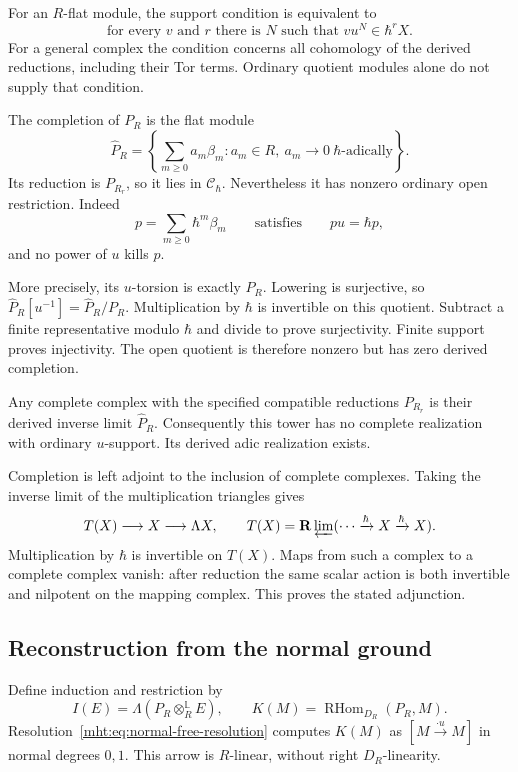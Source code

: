 For an $R$-flat module, the support condition is equivalent to
\[
 \text{for every }v\text{ and }r\text{ there is }N
             \text{ such that }vu^N\in\hbar^rX.
\]
For a general complex the condition concerns all cohomology
of the derived reductions, including their Tor terms.
Ordinary quotient modules alone do not supply that condition.

\begin{example}\label{mht:ex:completed-principal-parts}
The completion of $P_R$ is the flat module
\[
 \widehat P_R=
 \left\{\sum_{m\geq0}a_m\beta_m:
       a_m\in R,\ a_m\longrightarrow0\ \hbar\text{-adically}\right\}.
\]
Its reduction is $P_{R_r}$, so it lies in $\mathcal C_\hbar$.
Nevertheless it has nonzero ordinary open restriction.
Indeed
\[
 p=\sum_{m\geq0}\hbar^m\beta_m
 \qquad\text{satisfies}\qquad pu=\hbar p,
\]
and no power of $u$ kills $p$.

More precisely, its $u$-torsion is exactly $P_R$.
Lowering is surjective, so
$\widehat P_R[u^{-1}]=\widehat P_R/P_R$.
Multiplication by $\hbar$ is invertible on this quotient.
Subtract a finite representative modulo $\hbar$ and divide
to prove surjectivity. Finite support proves injectivity.
The open quotient is therefore nonzero but
has zero derived completion.

Any complete complex with the specified compatible reductions
$P_{R_r}$ is their derived inverse limit $\widehat P_R$.
Consequently this tower has no complete realization with
ordinary $u$-support. Its derived adic realization exists.
\end{example}

Completion is left adjoint to the inclusion of complete
complexes. Taking the inverse limit of the multiplication
triangles gives
\[
 T(X)\longrightarrow X\longrightarrow\Lambda X,
 \qquad T(X)=\mathbf R\varprojlim(\cdots\xrightarrow{\hbar}X
                                      \xrightarrow{\hbar}X).
\]
Multiplication by $\hbar$ is invertible on $T(X)$.
Maps from such a complex to a complete complex vanish:
after reduction the same scalar action is both invertible
and nilpotent on the mapping complex. This proves the
stated adjunction.

\subsection{Reconstruction from the normal ground}

Define induction and restriction by
\[
 I(E)=\Lambda(P_R\otimes_R^{\mathbb L}E),
 \qquad K(M)=\operatorname{RHom}_{D_R}(P_R,M).
\]
Resolution~\eqref{mht:eq:normal-free-resolution} computes
$K(M)$ as $[M\xrightarrow{\cdot u}M]$ in normal degrees
$0,1$. This arrow is $R$-linear, without right
$D_R$-linearity.

